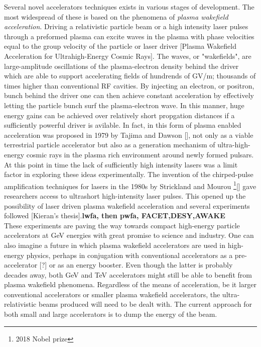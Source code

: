 \indent Several novel accelerators techniques exists in various stages of development. The most widespread of these is based on the phenomena of \textit{plasma wakefield acceleration}. Driving a relativistic particle beam or a high intensity laser pulses through a preformed plasma can excite waves in the plasma with phase velocities equal to the group velocity of the particle or laser driver [Plasma Wakefield Acceleration for Ultrahigh-Energy Cosmic Rays]. The waves, or "wakefields", are large-amplitude oscillations of the plasma-electron density behind the driver which are able to support accelerating fields of hundrends of GV/m; thousands of times higher than conventional RF cavities. By injecting an electron, or positron, bunch behind the driver one can then achieve constant acceleration by effectively letting the particle bunch surf the plasma-electron wave. In this manner, huge energy gains can be achieved over relatively short propgation distances if a sufficiently powerful driver is avilable. In fact, in this form of plasma enabled acceleration was proposed in 1979 by Tajima and Dawson [], not only as a viable terrestrial particle accelerator but also as a generation mechanism of ultra-high-energy cosmic rays in the plasma rich environment around newly formed pulsars. At this point in time the lack of sufficiently high intensity lasers was a limit factor in exploring these ideas experimentally. The invention of the chirped-pulse amplification techniques for lasers in the 1980s by Strickland and Mourou \footnote{2018 Nobel prize }[] gave researchers access to ultrashort high-intensity laser pulses. This opened up the possibility of laser driven plasma wakefield acceleration and several experiments followed [Kieran's thesis].\textbf{lwfa, then pwfa, FACET,DESY,AWAKE}\\ 
These experiments are paving the way towards compact high-energy particle accelerators at GeV energies with great promise to science and industry. One can also imagine a future in which plasma wakefield accelerators are used in high-energy physics, perhaps in conjugation with conventional accelerators as a pre-accelerator [?] or as an energy booster. Even though the latter is probably decades away, both GeV and TeV accelerators might still be able to benefit from plasma wakefield phenomena. Regardless of the means of acceleration, be it larger conventional accelerators or smaller plasma wakefield accelerators, the ultra-relativistic beams produced will need to be dealt with. The current approach for both small and large accelerators is to dump the energy of the beam. \vspace{-8pt}
